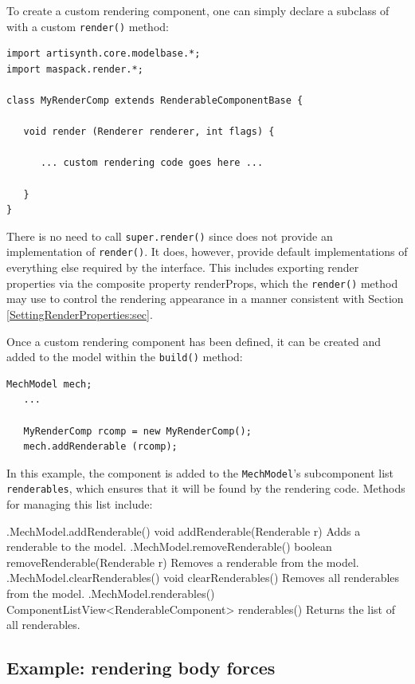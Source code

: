 To create a custom rendering component, one can simply declare a subclass
of 
with a custom {\tt render()} method:
%
\begin{lstlisting}[]
import artisynth.core.modelbase.*;
import maspack.render.*;

class MyRenderComp extends RenderableComponentBase {
  
   void render (Renderer renderer, int flags) {
      
      ... custom rendering code goes here ...

   }
}
\end{lstlisting}
%
There is no need to call {\tt super.render()} since 
does not provide an implementation of {\tt render()}.  It does,
however, provide default implementations of everything else required
by the  interface. This includes
exporting render properties via the composite property {\sf
renderProps}, which the {\tt render()} method may use to control the
rendering appearance in a manner consistent with
Section \ref{SettingRenderProperties:sec}.

Once a custom rendering component has been defined, it can be created
and added to the model within the {\tt build()} method:
%
\begin{lstlisting}[]
   MechModel mech; 
   ...

   MyRenderComp rcomp = new MyRenderComp();
   mech.addRenderable (rcomp);
\end{lstlisting}
%
In this example, the component is added to the {\tt MechModel}'s
subcomponent list {\tt renderables}, which ensures that it will be
found by the rendering code. Methods for managing this list include:
%
\begin{methodtable}{0.55}{0.45}
\midline
%
\methodentry
{\mech.MechModel.addRenderable()}
{void addRenderable(Renderable r)}%
{Adds a renderable to the model.}%
%
\methodentry
{\mech.MechModel.removeRenderable()}
{boolean removeRenderable(Renderable r)}%
{Removes a renderable from the model.}%
%
\methodentry
{\mech.MechModel.clearRenderables()}
{void clearRenderables()}%
{Removes all renderables from the model.}%
%
\methodentry
{\mech.MechModel.renderables()}
{ComponentListView<RenderableComponent> renderables()}%
{Returns the list of all renderables.}%
\midline
\end{methodtable}
%

\subsection{Example: rendering body forces}
\label{RenderingBodyForces:sec}

